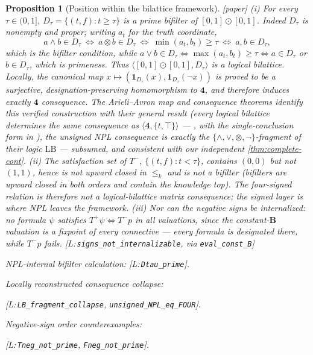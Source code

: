 \documentclass[11pt,a4paper]{article}
\newtheorem{proposition}[theorem]{Proposition}
\theoremstyle{definition}
\newcommand{\FOUR}{\mathbf{4}}
\newcommand{\vB}{\mathbf{B}}
\newcommand{\lek}{\le_{k}}
\newcommand{\Tp}{T^{+}}\newcommand{\Tm}{T^{-}}
\newcommand{\lean}[1]{\texttt{#1}}
\begin{document}
\begin{proposition}[Position within the bilattice framework]\label{prop:bifilter}
\textnormal{[paper]}
(i) For every $\tau\in(0,1]$, $D_\tau=\{(t,f):t\ge\tau\}$ is a prime
bifilter of $[0,1]\odot[0,1]$. Indeed $D_\tau$ is nonempty and proper;
writing $a_t$ for the truth coordinate,
\[
 a\wedge b\in D_\tau\ \Longleftrightarrow\
 a\otimes b\in D_\tau\ \Longleftrightarrow\
 \min(a_t,b_t)\ge\tau\ \Longleftrightarrow\
 a,b\in D_\tau,
\]
which is the bifilter condition, while
$a\vee b\in D_\tau\Longleftrightarrow
\max(a_t,b_t)\ge\tau\Longleftrightarrow a\in D_\tau$ or
$b\in D_\tau$, which is primeness. Thus
$\langle[0,1]\odot[0,1],D_\tau\rangle$ is a logical bilattice. Locally, the
canonical map $x\mapsto(\mathbf1_{D_\tau}(x),
\mathbf1_{D_\tau}(\lnot x))$ is proved to be a surjective,
designation-preserving homomorphism to $\FOUR$, and therefore induces exactly
$\FOUR$ consequence. The Arieli--Avron map and consequence theorems identify
this verified construction with their general result (every logical bilattice
determines the same consequence as
$\langle\FOUR,\{t,\top\}\rangle$ ---
\cite[Thms.~2.17, 3.4]{arieli1996reasoning}, with the single-conclusion form in
\cite[Thm.~2.1.4]{rivieccio2010algebraic}), the \emph{unsigned} NPL
consequence is exactly the $\{\wedge,\vee,\otimes,\lnot\}$-fragment of
their logic $\mathrm{LB}$ --- subsumed, and consistent with our independent
\cref{thm:complete-cont}. (ii) The satisfaction set of $\Tm$,
$\{(t,f):t<\tau\}$, contains $(0,0)$ but not $(1,1)$, hence is not upward
closed in $\lek$ and is not a bifilter (bifilters are upward closed in both
orders and contain the knowledge top). The four-signed relation is
therefore not a logical-bilattice matrix consequence; the signed layer is
where NPL leaves the framework. (iii) Nor can the negative signs be
internalized: no formula $\psi$ satisfies
$\Tp\psi\iff\Tm p$ in all valuations, since the constant-$\vB$ valuation is
a fixpoint of every connective --- every formula is designated there, while
$\Tm p$ fails. [L:\,\lean{signs\_not\_internalizable}, via
\lean{eval\_const\_B}]
\par\noindent
\textnormal{\small NPL-internal bifilter calculation:
[L:\,\lean{Dtau\_prime}].}
\par\noindent
\textnormal{\small Locally reconstructed consequence collapse:}
\par\noindent
\textnormal{\small
[L:\,\lean{LB\_fragment\_collapse}, \lean{unsigned\_NPL\_eq\_FOUR}].}
\par\noindent
\textnormal{\small Negative-sign order counterexamples:}
\par\noindent
\textnormal{\small
[L:\,\lean{Tneg\_not\_prime}, \lean{Fneg\_not\_prime}].}
\end{proposition}
\end{document}
